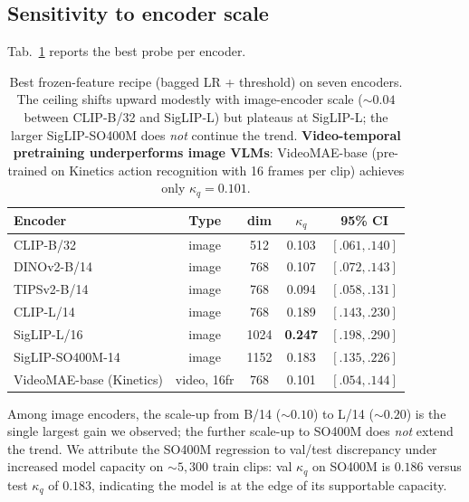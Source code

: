 \subsection{Sensitivity to encoder scale}
\label{sec:scale}

Tab.~\ref{tab:encoders} reports the best probe per encoder.

\begin{table}[t]
\caption{Best frozen-feature recipe (bagged LR + threshold) on seven
encoders. The ceiling shifts upward modestly with image-encoder scale
($\sim 0.04$ between CLIP-B/32 and SigLIP-L) but plateaus at
SigLIP-L; the larger SigLIP-SO400M does \emph{not} continue the
trend. \textbf{Video-temporal pretraining underperforms image VLMs}:
VideoMAE-base (pre-trained on Kinetics action recognition with 16
frames per clip) achieves only $\kappa_q = 0.101$.}
\label{tab:encoders}
\centering
\small
\begin{tabular}{lcccc}
\toprule
Encoder & Type & dim & $\kappa_q$ & 95\% CI \\
\midrule
CLIP-B/32 & image & 512 & 0.103 & $[.061, .140]$\\
DINOv2-B/14 & image & 768 & 0.107 & $[.072, .143]$\\
TIPSv2-B/14 & image & 768 & 0.094 & $[.058, .131]$\\
CLIP-L/14 & image & 768 & 0.189 & $[.143, .230]$\\
SigLIP-L/16 & image & 1024 & \textbf{0.247} & $[.198, .290]$\\
SigLIP-SO400M-14 & image & 1152 & 0.183 & $[.135, .226]$\\
\hline
VideoMAE-base (Kinetics) & video, 16fr & 768 & 0.101 & $[.054, .144]$\\
\bottomrule
\end{tabular}
\end{table}

Among image encoders, the scale-up from B/14 ($\sim 0.10$) to L/14
($\sim 0.20$) is the single largest gain we observed; the further
scale-up to SO400M does \emph{not} extend the trend. We attribute
the SO400M regression to val/test discrepancy under increased model
capacity on $\sim 5{,}300$ train clips: val $\kappa_q$ on SO400M is
$0.186$ versus test $\kappa_q$ of $0.183$, indicating the model is
at the edge of its supportable capacity.

